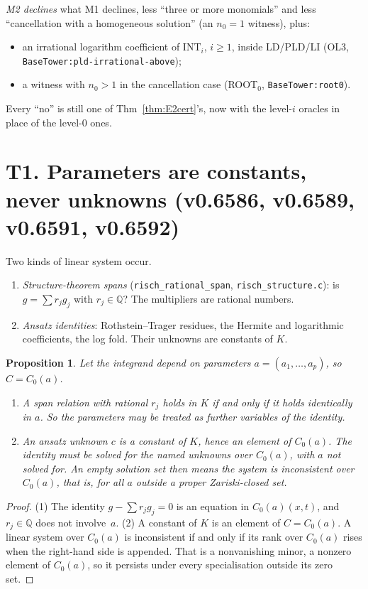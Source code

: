 \documentclass[11pt]{article}
\newtheorem{proposition}[theorem]{Proposition}
\theoremstyle{definition}
\theoremstyle{remark}
\newcommand{\Q}{\mathbb{Q}}
\newcommand{\code}[1]{\texttt{#1}}
\begin{document}
\emph{M2 declines} what M1 declines, less ``three or more monomials'' and less ``cancellation
with a homogeneous solution'' (an $n_0=1$ witness), plus:
\begin{itemize}
\item an irrational logarithm coefficient of INT$_i$, $i\ge1$, inside LD/PLD/LI (OL3,
  \code{BaseTower:pld-irrational-above});
\item a witness with $n_0>1$ in the cancellation case (ROOT$_0$, \code{BaseTower:root0}).
\end{itemize}
Every ``no'' is still one of Thm~\ref{thm:E2cert}'s, now with the level-$i$ oracles in place of
the level-0 ones.

\section*{T1. Parameters are constants, never unknowns (v0.6586, v0.6589, v0.6591, v0.6592)}

Two kinds of linear system occur.
\begin{enumerate}
\item \emph{Structure-theorem spans} (\code{risch\_rational\_span}, \code{risch\_structure.c}):
  is $g=\sum r_jg_j$ with $r_j\in\Q$? The multipliers are rational numbers.
\item \emph{Ansatz identities}: Rothstein--Trager residues, the Hermite and logarithmic
  coefficients, the log fold. Their unknowns are constants of $K$.
\end{enumerate}

\begin{proposition}\label{prop:T1}
Let the integrand depend on parameters $a=(a_1,\dots,a_p)$, so $C=C_0(a)$.
\begin{enumerate}
\item A span relation with rational $r_j$ holds in $K$ if and only if it holds
  identically in $a$. So the parameters may be treated as further variables of the
  identity.
\item An ansatz unknown $c$ is a constant of $K$, hence an element of $C_0(a)$. The
  identity must be solved for the named unknowns over $C_0(a)$, with $a$ \emph{not}
  solved for. An empty solution set then means the system is inconsistent over
  $C_0(a)$, that is, for all $a$ outside a proper Zariski-closed set.
\end{enumerate}
\end{proposition}

\begin{proof}
(1) The identity $g-\sum r_jg_j=0$ is an equation in $C_0(a)(x,t)$, and $r_j\in\Q$
does not involve~$a$. (2) A constant of $K$ is an element of $C=C_0(a)$. A linear system
over $C_0(a)$ is inconsistent if and only if its rank over $C_0(a)$ rises when the
right-hand side is appended. That is a nonvanishing minor, a nonzero element of
$C_0(a)$, so it persists under every specialisation outside its zero set.
\end{proof}
\end{document}
